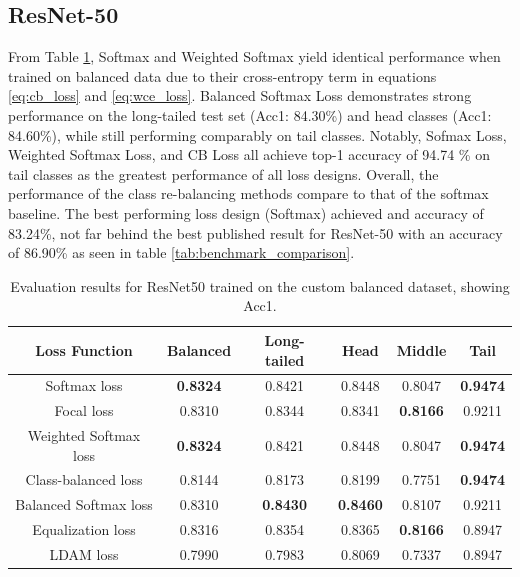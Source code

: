 \subsection{ResNet-50}

From Table \ref{tab:resnet_bal_acc1_1}, Softmax and Weighted Softmax yield identical performance when trained on balanced data due to their cross-entropy term in equations \eqref{eq:cb_loss} and \eqref{eq:wce_loss}. Balanced Softmax Loss demonstrates strong performance on the long-tailed test set (Acc1: 84.30\%) and head classes (Acc1: 84.60\%), while still performing comparably on tail classes. Notably, Sofmax Loss, Weighted Softmax Loss, and CB Loss all achieve top-1 accuracy of 94.74 \% on tail classes as the greatest performance of all loss designs. Overall, the performance of the class re-balancing methods compare to that of the softmax baseline. The best performing loss design (Softmax) achieved and accuracy of 83.24\%, not far behind the best published result for ResNet-50 with an accuracy of 86.90\% as seen in table \ref{tab:benchmark_comparison}.

\begin{table}[h!]
    \centering
    \caption{Evaluation results for ResNet50 trained on the custom balanced dataset, showing Acc1.}
    \small
    \begin{tabular}{cccccc}
        \toprule
        Loss Function & Balanced & Long-tailed & Head & Middle & Tail \\ 
        \midrule
        Softmax loss   & \textbf{0.8324}  & 0.8421 & 0.8448 & 0.8047 & \textbf{0.9474} \\
        Focal loss   & 0.8310  & 0.8344 & 0.8341 & \textbf{0.8166} & 0.9211 \\
        Weighted Softmax loss   & \textbf{0.8324} & 0.8421 & 0.8448 & 0.8047 & \textbf{0.9474} \\
        Class-balanced loss   &  0.8144 & 0.8173 & 0.8199 & 0.7751 & \textbf{0.9474} \\
        Balanced Softmax loss   & 0.8310 & \textbf{0.8430} & \textbf{0.8460} & 0.8107 & 0.9211 \\
        Equalization loss   & 0.8316 & 0.8354 & 0.8365 & \textbf{0.8166} & 0.8947 \\
        LDAM loss   & 0.7990 & 0.7983 & 0.8069 & 0.7337 & 0.8947 \\
        \bottomrule
    \end{tabular}
    \label{tab:resnet_bal_acc1_1}
\end{table}

